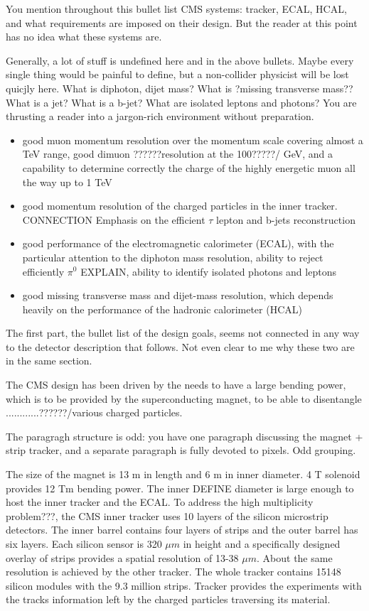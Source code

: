 You mention throughout this bullet list CMS systems: tracker, ECAL, HCAL, and what requirements are imposed on their design. But the reader at this point has no idea what these systems are.

Generally, a lot of stuff is undefined here and in the above bullets. Maybe every single thing would be painful to  define, but a non-collider physicist will be lost quicjly here. 
  What is diphoton, dijet mass? 
  What is ?missing transverse mass??
  What is a jet? What is a b-jet?
   What are isolated leptons and photons?
  You are thrusting a reader into a jargon-rich environment without preparation.
 

\begin{itemize}
\item good muon momentum resolution over the momentum scale covering almost a TeV range, good dimuon ??????resolution at the 100?????/ GeV, and a capability to determine correctly the charge of the highly energetic muon all the way up to 1 TeV
\item good momentum resolution of the charged particles in the inner tracker. CONNECTION Emphasis on the efficient $\tau$ lepton and b-jets reconstruction
\item good performance of the electromagnetic calorimeter (ECAL), with the particular attention to the diphoton mass resolution, ability to reject efficiently $\pi^0$ EXPLAIN, ability to identify isolated photons and leptons
\item good missing transverse mass and dijet-mass resolution, which depends heavily on the performance of the hadronic calorimeter (HCAL)
\end{itemize}

The first part, the bullet list of the design goals, seems not connected in any way to the detector description that follows. Not even clear to me why these two are in the same section.


The CMS design has been driven by the needs to have a large bending power, which is to be provided by the superconducting magnet, to be able to disentangle ............??????/various charged particles. 

The paragragh structure is odd: you have one paragraph discussing the magnet + strip tracker, and a separate paragraph is fully devoted to pixels. Odd grouping.






The size of the magnet is 13 m in length and 6 m in inner diameter. 4 T solenoid provides 12 Tm bending power. The inner  DEFINE diameter is large enough to host the inner tracker and the ECAL. To address the high multiplicity problem???, the CMS inner tracker uses 10 layers of the silicon microstrip detectors. The inner barrel contains four layers of strips and the outer barrel has six layers. Each silicon sensor is 320 $\mu m$ in height and a specifically designed overlay of strips provides a spatial resolution of 13-38 $\mu m$. About the same resolution is achieved by the other tracker. The whole tracker contains 15148 silicon modules with the 9.3 million strips. Tracker provides the experiments with the tracks information left by the charged particles traversing its material. 

